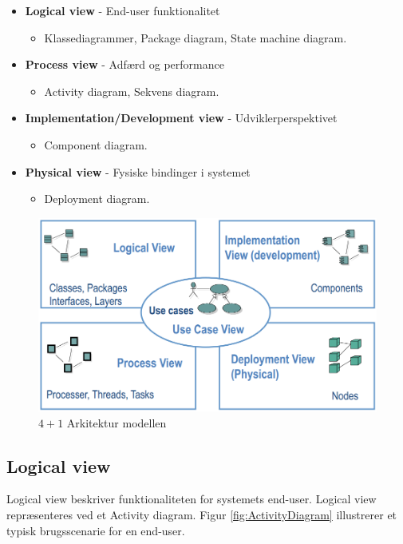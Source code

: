 \begin{itemize}
	\item \textbf{Logical view} - End-user funktionalitet
	\begin{itemize}
		\item Klassediagrammer, Package diagram, State machine diagram.
	\end{itemize}
	\item \textbf{Process view} - Adfærd og performance
	\begin{itemize}
		\item Activity diagram, Sekvens diagram.
	\end{itemize}
	\item \textbf{Implementation/Development view} - Udviklerperspektivet
	\begin{itemize}
		\item Component diagram.
	\end{itemize}
	\item \textbf{Physical view} - Fysiske bindinger i systemet
	\begin{itemize}
		\item Deployment diagram.
	\end{itemize}
\end{itemize}

\begin{figure}[h]
	\centering
	\includegraphics[width=0.9\linewidth]{figs/arkitektur/41model}
	\caption{$4+1$ Arkitektur modellen \cite{flylib}}
	\label{fig:41model}
\end{figure}


\subsection{Logical view}
Logical view beskriver funktionaliteten for systemets end-user. Logical view repræsenteres ved et Activity diagram. Figur \ref{fig:ActivityDiagram} illustrerer et typisk brugsscenarie for en end-user. 

